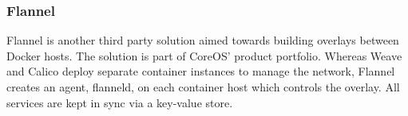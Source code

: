 






\subsubsection{Flannel}
Flannel is another third party solution aimed towards building overlays between Docker hosts. The solution is part of CoreOS' product portfolio. Whereas Weave and Calico deploy separate container instances to manage the network, Flannel creates an agent, flanneld, on each container host which controls the overlay. All services are kept in sync via a key-value store.

